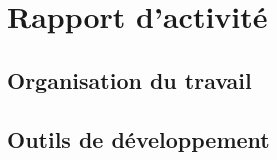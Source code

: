 \section{Rapport d'activité}

\subsection{Organisation du travail}


\subsection{Outils de développement}



